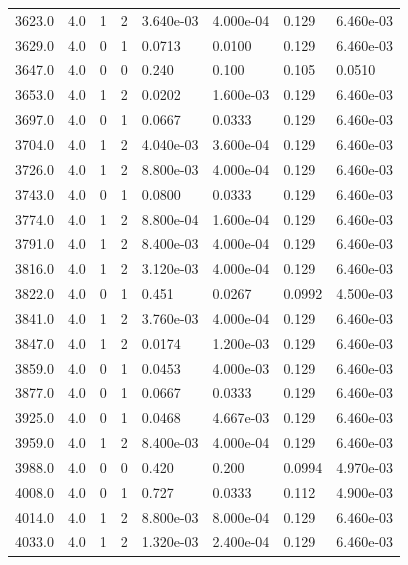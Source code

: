 \documentclass[preview]{standalone}
\begin{document}
{{{{\begin{tabular}{L{1.2cm}C{1.2cm} C{0.3cm}C{0.5cm} C{1.4cm}C{1.4cm} C{1.4cm}C{1.4cm}}
  3623.0  &   4.0  & 1     &  2 &  3.640e-03  & 4.000e-04  & 0.129 &  6.460e-03   \\ 
  3629.0  &   4.0  & 0     &  1 &  0.0713  & 0.0100  & 0.129 &  6.460e-03   \\ 
  3647.0  &   4.0  & 0     &  0 &  0.240  & 0.100  & 0.105 &  0.0510   \\ 
  3653.0  &   4.0  & 1     &  2 &  0.0202  & 1.600e-03  & 0.129 &  6.460e-03   \\ 
  3697.0  &   4.0  & 0     &  1 &  0.0667  & 0.0333  & 0.129 &  6.460e-03   \\ 
  3704.0  &   4.0  & 1     &  2 &  4.040e-03  & 3.600e-04  & 0.129 &  6.460e-03   \\ 
  3726.0  &   4.0  & 1     &  2 &  8.800e-03  & 4.000e-04  & 0.129 &  6.460e-03   \\ 
  3743.0  &   4.0  & 0     &  1 &  0.0800  & 0.0333  & 0.129 &  6.460e-03   \\ 
  3774.0  &   4.0  & 1     &  2 &  8.800e-04  & 1.600e-04  & 0.129 &  6.460e-03   \\ 
  3791.0  &   4.0  & 1     &  2 &  8.400e-03  & 4.000e-04  & 0.129 &  6.460e-03   \\ 
  3816.0  &   4.0  & 1     &  2 &  3.120e-03  & 4.000e-04  & 0.129 &  6.460e-03   \\ 
  3822.0  &   4.0  & 0     &  1 &  0.451  & 0.0267  & 0.0992 &  4.500e-03   \\ 
  3841.0  &   4.0  & 1     &  2 &  3.760e-03  & 4.000e-04  & 0.129 &  6.460e-03   \\ 
  3847.0  &   4.0  & 1     &  2 &  0.0174  & 1.200e-03  & 0.129 &  6.460e-03   \\ 
  3859.0  &   4.0  & 0     &  1 &  0.0453  & 4.000e-03  & 0.129 &  6.460e-03   \\ 
  3877.0  &   4.0  & 0     &  1 &  0.0667  & 0.0333  & 0.129 &  6.460e-03   \\ 
  3925.0  &   4.0  & 0     &  1 &  0.0468  & 4.667e-03  & 0.129 &  6.460e-03   \\ 
  3959.0  &   4.0  & 1     &  2 &  8.400e-03  & 4.000e-04  & 0.129 &  6.460e-03   \\ 
  3988.0  &   4.0  & 0     &  0 &  0.420  & 0.200  & 0.0994 &  4.970e-03   \\ 
  4008.0  &   4.0  & 0     &  1 &  0.727  & 0.0333  & 0.112 &  4.900e-03   \\ 
  4014.0  &   4.0  & 1     &  2 &  8.800e-03  & 8.000e-04  & 0.129 &  6.460e-03   \\ 
  4033.0  &   4.0  & 1     &  2 &  1.320e-03  & 2.400e-04  & 0.129 &  6.460e-03   \\ 

\end{tabular}}}}}
\end{document}
